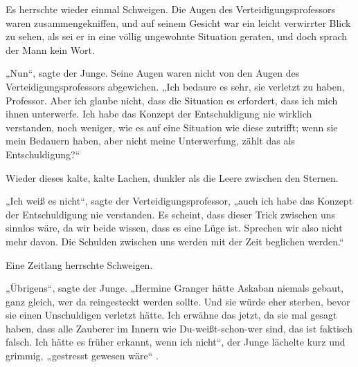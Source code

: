 Es herrschte wieder einmal Schweigen. Die Augen des Verteidigungsprofessors waren zusammengekniffen, und auf seinem Gesicht war ein leicht verwirrter Blick zu sehen, als sei er in eine völlig ungewohnte Situation geraten, und doch sprach der Mann kein Wort.

„Nun“, sagte der Junge. Seine Augen waren nicht von den Augen des Verteidigungsprofessors abgewichen.
„Ich bedaure es sehr, sie verletzt zu haben, Professor. Aber ich glaube nicht, dass die Situation es erfordert, dass ich mich ihnen unterwerfe. Ich habe das Konzept der Entschuldigung nie wirklich verstanden, noch weniger, wie es auf eine Situation wie diese zutrifft; wenn sie mein Bedauern haben, aber nicht meine Unterwerfung, zählt das als Entschuldigung?“

Wieder dieses kalte, kalte Lachen, dunkler als die Leere zwischen den Sternen.

„Ich weiß es nicht“, sagte der Verteidigungsprofessor, „auch ich habe das Konzept der Entschuldigung nie verstanden. Es scheint, dass dieser Trick zwischen uns sinnlos wäre, da wir beide wissen, dass es eine Lüge ist. Sprechen wir also nicht mehr davon. Die Schulden zwischen uns werden mit der Zeit beglichen werden.“

Eine Zeitlang herrschte Schweigen.

„Übrigens“, sagte der Junge.
„Hermine Granger hätte Askaban niemals gebaut, ganz gleich, wer da reingesteckt werden sollte. Und sie würde eher sterben, bevor sie einen Unschuldigen verletzt hätte. Ich erwähne das jetzt, da sie mal gesagt haben, dass alle Zauberer im Innern wie Du-weißt-schon-wer sind, das ist faktisch falsch. Ich hätte es früher erkannt, wenn ich nicht“, der Junge lächelte kurz und grimmig, „gestresst gewesen wäre“ .


